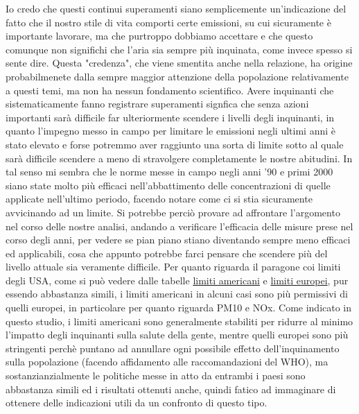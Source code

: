 \documentclass{article}
\begin{document}
Io credo che questi continui superamenti siano semplicemente un'indicazione del fatto che il nostro stile di vita comporti certe emissioni, su cui sicuramente è importante lavorare, ma che purtroppo dobbiamo accettare e che questo comunque non significhi che l'aria sia sempre più inquinata, come invece spesso si sente dire. Questa "credenza", che viene smentita anche nella relazione, ha origine probabilmenete dalla sempre maggior attenzione della popolazione relativamente a questi temi, ma non ha nessun fondamento scientifico. Avere inquinanti che sistematicamente fanno registrare superamenti signfica che senza azioni importanti sarà difficile far ulteriormente scendere i livelli degli inquinanti, in quanto l'impegno messo in campo per limitare le emissioni negli ultimi anni è stato elevato e forse potremmo aver raggiunto una sorta di limite sotto al quale sarà difficile scendere a meno di stravolgere completamente le nostre abitudini. In tal senso mi sembra che le norme messe in campo negli anni '90 e primi 2000 siano state molto più efficaci nell'abbattimento delle concentrazioni di quelle applicate nell'ultimo periodo, facendo notare come ci si stia sicuramente avvicinando ad un limite. Si potrebbe perciò provare ad affrontare l'argomento nel corso delle nostre analisi, andando a verificare l'efficacia delle misure prese nel corso degli anni, per vedere se pian piano stiano diventando sempre meno efficaci ed applicabili, cosa che appunto potrebbe farci pensare che scendere più del livello attuale sia veramente difficile.
Per quanto riguarda il paragone coi limiti degli USA, come si può vedere dalle tabelle \href{https://en.wikipedia.org/wiki/National_Ambient_Air_Quality_Standards}{limiti americani} e \href{https://ec.europa.eu/environment/air/quality/standards.htm}{limiti europei}, pur essendo abbastanza simili, i limiti americani in alcuni casi sono più permissivi di quelli europei, in particolare per quanto riguarda PM10 e NOx. Come indicato in questo studio\cite{kuklinska2015air}, i limiti americani sono generalmente stabiliti per ridurre al minimo l'impatto degli inquinanti sulla salute della gente, mentre quelli europei sono più stringenti perchè puntano ad annullare ogni possibile effetto dell'inquinamento sulla popolazione (facendo affidamento alle raccomandazioni del WHO), ma sostanzianzialmente le politiche messe in atto da entrambi i paesi sono abbastanza simili ed i risultati ottenuti anche, quindi fatico ad immaginare di ottenere delle indicazioni utili da un confronto di questo tipo. 
\end{document}
